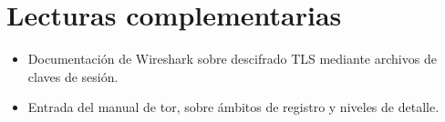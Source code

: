 \section*{Lecturas complementarias}
\begin{itemize}
  \item Documentación de Wireshark sobre descifrado TLS mediante archivos de claves de sesión.
  \item Entrada  del manual de tor, sobre ámbitos de registro y niveles de detalle.
\end{itemize}
